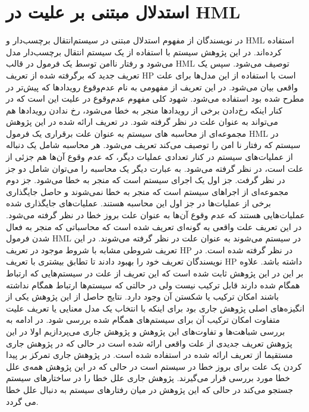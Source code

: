 \section{استدلال مبتنی بر علیت در 
HML
}
در
\cite{decomposing}
نویسندگان از مفهوم استدلال مبتنی در سیستم‌انتقال برچسب‌دار
و 
HML
 \cite{hml}
استفاده کرده‌اند.
در این پژوهش سیستم با استفاده از یک سیستم انتقال برچسب‌دار مدل می‌شود و رفتار ناامن توسط یک فرمول در قالب
HML
توصیف می‌شود.
سپس یک تعریف جدید که برگرفته شده از تعریف
HP
است با استفاده از این مدل‌ها برای علت واقعی بیان می‌شود.
در این تعریف از مفهومی به نام عدم‌وقوع
رویدادها که پیش‌تر در 
\cite{causality-checking}
مطرح شده بود استفاده می‌شود.
شهود کلی مفهوم عدم‌وقوع در علیت این است که در کنار اینکه رخ‌دادن برخی از رویداد‌ها منجر به خطا می‌شود، رخ ندادن رویداد‌ها هم می‌تواند به عنوان علت در نظر گرفته شود.
در تعریف ارائه شده در این پژوهش مجموعه‌ای از محاسبه‌
های سیستم به عنوان علت برقراری یک فرمول 
HML
در سیستم که رفتار نا امن
را توصیف می‌کند تعریف می‌شود.
هر محاسبه شامل یک دنباله از عملیات‌های سیستم در کنار تعدادی عملیات دیگر، که عدم وقوع آن‌ها هم جزئی از علت است، در نظر گرفته می‌شود.
به عبارت دیگر یک محاسبه را می‌توان شامل دو جز در نظر گرفت.
جز اول یک اجرای سیستم است که منجر به خطا می‌شود.
جز دوم مجموعه‌ای از اجراهای سیستم‌ است که منجر به خطا نمی‌شوند و حاصل جایگذاری
برخی از عملیات‌ها در جز اول این محاسبه هستند.
عملیات‌های جایگذاری شده عملیات‌هایی هستند که عدم وقوع آن‌ها به عنوان علت بروز 
خطا در نظر گرفته می‌شود.
در این تعریف علت‌ واقعی به گونه‌ای تعریف شده است که محاسباتی‌ که منجر به فعال شدن فرمول 
HML
در سیستم می‌شوند به عنوان علت در نظر گرفته می‌شوند.
در این تعریف شروطی مشابه با شروط موجود در تعریف 
HP
در نظر گرفته شده است.
در 
\cite{causal-hml}
نویسندگان تعریف خود را بهبود دادند تا تطابق بیشتری با تعریف 
HP
داشته باشد.
علاوه بر این در این پژوهش ثابت شده است که این تعریف از علت در سیستم‌هایی که ارتباط همگام
شده دارند قابل ترکیب نیست ولی در حالتی که سیستم‌ها ارتباط همگام نداشته باشند امکان ترکیب یا شکستن آن وجود دارد.
نتایج حاصل از این پژوهش یکی از انگیزه‌های اصلی پژوهش جاری بود برای اینکه با انتخاب یک مدل معنایی یا تعریف علیت متفاوت امکان ترکیب آن برای سیستم‌های همگام شده بررسی شود.
در ادامه به بررسی شباهت‌ها و تفاوت‌های این پژوهش و پژوهش جاری می‌پردازیم
اولا در این پژوهش تعریف جدیدی از علت واقعی ارائه شده است در حالی که در پژوهش جاری مستقیما از تعریف ارائه شده در
\cite{hp}
استفاده شده است.
در پژوهش جاری تمرکز بر پیدا کردن یک علت برای بروز خطا در سیستم است در حالی که در این پژوهش همه‌ی علل خطا مورد بررسی قرار می‌گیرند.
پژوهش جاری علل خطا را در ساختار‌های سیستم جستجو می‌کند در حالی که این پژوهش در میان رفتار‌های سیستم به دنبال علل خطا می گردد.

